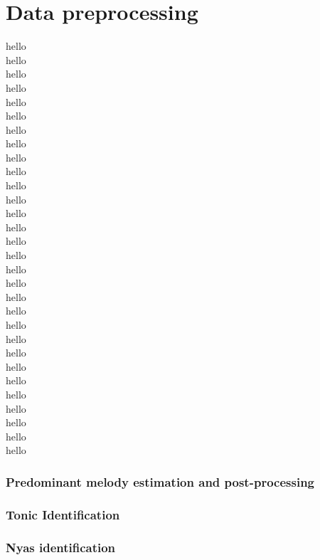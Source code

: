 
\chapter{Data preprocessing}

hello\\
hello\\
hello\\
hello\\
hello\\
hello\\
hello\\
hello\\
hello\\
hello\\
hello\\
hello\\
hello\\
hello\\
hello\\
hello\\
hello\\
hello\\
hello\\
hello\\
hello\\
hello\\
hello\\
hello\\
hello\\
hello\\
hello\\
hello\\
hello\\
hello\\

\subsection{Predominant melody estimation and post-processing}

\subsection{Tonic Identification}

\subsection{Nyas identification}




